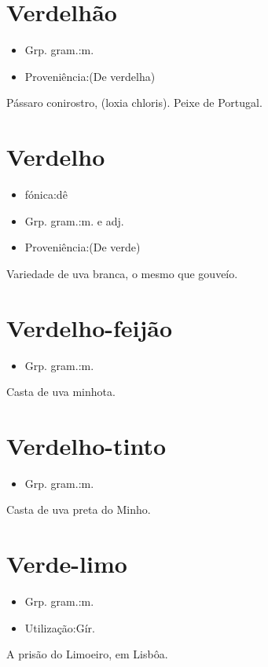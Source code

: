 \documentclass{article}
\begin{document}
\section{Verdelhão}
\begin{itemize}
\item {Grp. gram.:m.}
\end{itemize}
\begin{itemize}
\item {Proveniência:(De \textunderscore verdelha\textunderscore )}
\end{itemize}
Pássaro conirostro, (\textunderscore loxia chloris\textunderscore ).
Peixe de Portugal.
\section{Verdelho}
\begin{itemize}
\item {fónica:dê}
\end{itemize}
\begin{itemize}
\item {Grp. gram.:m.  e  adj.}
\end{itemize}
\begin{itemize}
\item {Proveniência:(De \textunderscore verde\textunderscore )}
\end{itemize}
Variedade de uva branca, o mesmo que \textunderscore gouveío\textunderscore .
\section{Verdelho-feijão}
\begin{itemize}
\item {Grp. gram.:m.}
\end{itemize}
Casta de uva minhota.
\section{Verdelho-tinto}
\begin{itemize}
\item {Grp. gram.:m.}
\end{itemize}
Casta de uva preta do Minho.
\section{Verde-limo}
\begin{itemize}
\item {Grp. gram.:m.}
\end{itemize}
\begin{itemize}
\item {Utilização:Gír.}
\end{itemize}
A prisão do Limoeiro, em Lisbôa.
\end{document}
